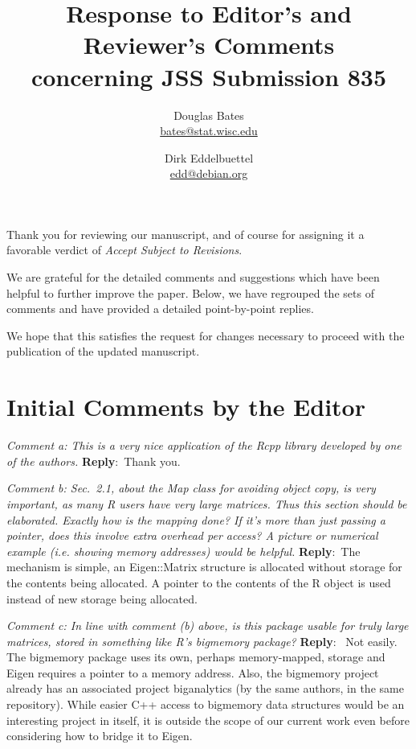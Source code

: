 \documentclass[10pt]{article}
\author{Douglas Bates\\ {\small \url{bates@stat.wisc.edu}}
  \and Dirk Eddelbuettel\\ {\small \url{edd@debian.org} }}
\title{Response to Editor's and Reviewer's Comments \\
  concerning JSS Submission 835}
\newcommand{\pointRaised}[2]{\smallskip %
  \textsl{{\fontseries{b}\selectfont #1}: #2}\newline}
\newcommand{\reply}[1]{\textbf{Reply}:\ #1 \smallskip } %
\begin{document}
\maketitle

Thank you for reviewing our manuscript, and of course for assigning it
a favorable verdict of \textsl{Accept Subject to Revisions}.

We are grateful for the detailed comments and suggestions which have been helpful
to further improve the paper. Below, we have regrouped the sets of comments
and have provided a detailed point-by-point replies.

We hope that this satisfies the request for changes necessary to proceed with
the publication of the updated manuscript.

\section*{Initial Comments by the Editor}

\pointRaised{Comment a}{
  This is a very nice application of the Rcpp library developed by one
  of the authors.
}
\reply{Thank you. 
}


\pointRaised{Comment b}{
  Sec.~2.1, about the Map class for avoiding object copy, is very
  important, as many R users have very large matrices. Thus this section
  should be elaborated. Exactly how is the mapping done? If it's more
  than just passing a pointer, does this involve extra overhead per
  access? A picture or numerical example (i.e. showing memory addresses)
  would be helpful.}
\reply{The mechanism is simple, an Eigen::Matrix structure is allocated
  without storage for the contents being allocated.  A pointer to the
  contents of the R object is used instead of new storage being
  allocated.
}


\pointRaised{Comment c}{
  In line with comment (b) above, is this package usable for truly
  large matrices, stored in something like R's bigmemory package?
}
\reply{
  Not easily.  The bigmemory package uses its own, perhaps
  memory-mapped, storage and Eigen requires a pointer to a memory
  address.  Also, the bigmemory project already has an associated project
  biganalytics (by the same authors, in the same repository).  While easier
  C++ access to bigmemory data structures would be an interesting project in itself, it
  is outside the scope of our current work even before considering how to
  bridge it to Eigen.
}
\end{document}
